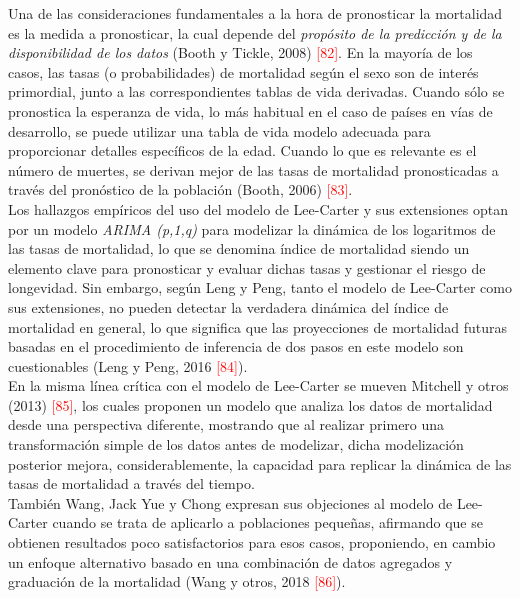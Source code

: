 Una de las consideraciones fundamentales a la hora de pronosticar la mortalidad es la medida a pronosticar, la cual depende del \textit{propósito de la predicción y de la disponibilidad de los datos} (Booth y Tickle, 2008) \textcolor{red}{[82]}. En la mayoría de los casos, las tasas (o probabilidades) de mortalidad según el sexo son de interés primordial, junto a las correspondientes tablas de vida derivadas. Cuando sólo se pronostica la esperanza de vida, lo más habitual en el caso de países en vías de desarrollo,  se puede utilizar una tabla de vida modelo adecuada para proporcionar detalles específicos de la edad. Cuando lo que es relevante es el número de muertes, se derivan mejor de las tasas de mortalidad pronosticadas a través del pronóstico de la población (Booth, 2006) \textcolor{red}{[83]}.\\

Los hallazgos empíricos del uso del modelo de Lee-Carter y sus extensiones optan por un modelo \textit{ARIMA (p,1,q)} para modelizar la dinámica de los logaritmos de las tasas de mortalidad, lo que se denomina índice de mortalidad siendo un elemento clave para pronosticar y evaluar dichas tasas y gestionar el riesgo de longevidad. Sin embargo, según Leng y Peng, tanto el modelo de Lee-Carter como sus extensiones, no pueden detectar la verdadera dinámica del índice de mortalidad en general, lo que significa que las proyecciones de mortalidad futuras basadas en el procedimiento de inferencia de dos pasos en este modelo son cuestionables (Leng y Peng, 2016 \textcolor{red}{[84]}).\\

En la misma línea crítica con el modelo de Lee-Carter se mueven Mitchell y otros (2013) \textcolor{red}{[85]}, los cuales proponen un modelo que analiza los datos de mortalidad desde una perspectiva diferente, mostrando que al realizar primero una transformación simple de los datos antes de modelizar, dicha modelización posterior mejora, considerablemente, la capacidad para replicar la dinámica de las tasas de mortalidad a través del tiempo.\\

También Wang, Jack Yue y Chong expresan sus objeciones al modelo de Lee-Carter cuando se trata de aplicarlo a poblaciones pequeñas, afirmando que se obtienen resultados poco satisfactorios para esos casos, proponiendo, en cambio un enfoque alternativo basado en una combinación de datos agregados y graduación de la mortalidad (Wang y otros, 2018 \textcolor{red}{[86]}).\\


